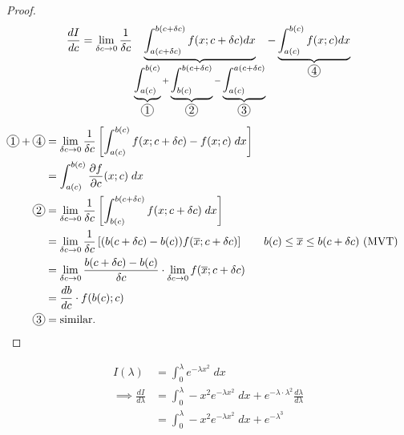\documentclass{../template/note}
\begin{document}
    \begin{proof}
        \begin{align*}
        \frac{dI}{dc} &= \lim_{\delta c \to 0} \frac{1}{\delta c} \underbrace{\int_{a(c+\delta c)}^{b(c + \delta c)} f(x; c + \delta c) dx}_{\underbrace{\int_{a(c)}^{b(c)}}_{\circled 1} + \underbrace{\int_{b(c)}^{b(c + \delta c)}}_{\circled 2} - \underbrace{\int_{a(c)}^{a(c + \delta c)}}_{\circled 3}} - \underbrace{\int_{a(c)}^{b(c)} f(x; c) dx}_{\circled 4} \\
        \end{align*}
        \begin{align*}
            \circled 1 + \circled 4 &= \lim_{\delta c \to 0} \frac{1}{\delta c} \left[\int_{a(c)}^{b(c)} f(x; c + \delta c) - f(x; c) \; dx \right] \\
            &= \int_{a(c)}^{b(c)} \frac{\partial f}{\partial c}(x; c) \; dx \\
            \circled 2 &= \lim_{\delta c \to 0} \frac{1}{\delta c} \left[\int_{b(c)}^{b(c + \delta c)} f(x; c + \delta c) \; dx\right] \\
            &= \lim_{\delta c \to 0} \frac{1}{\delta c} \left[(b(c + \delta c) - b(c)) f(\overline{x}; c + \delta c)\right] && b(c) \leq \overline{x} \leq b(c + \delta c) \text{ (MVT)} \\
            &= \lim_{\delta c \to 0} \frac{b(c + \delta c) - b(c)}{\delta c} \cdot \lim_{\delta c \to 0} f(\overline{x}; c + \delta c) \\
            &= \frac{db}{dc} \cdot f(b(c); c) \\
            \circled 3 &= \text{similar.}
        \end{align*}
        
        
    \end{proof}

    \begin{example}
        \begin{align*}
            I(\lambda) &= \int_0^\lambda e^{-\lambda x^2} \; dx \\
            \implies \frac{dI}{d \lambda} &= \int_0^\lambda -x^2 e^{-\lambda x^2} \; dx + e^{-\lambda \cdot \lambda^2} \frac{d \lambda}{d \lambda} \\
            &= \int_0^\lambda -x^2 e^{-\lambda x^2} \; dx + e^{-\lambda^3}
        \end{align*}
    \end{example}
    
    
    
\end{document}
